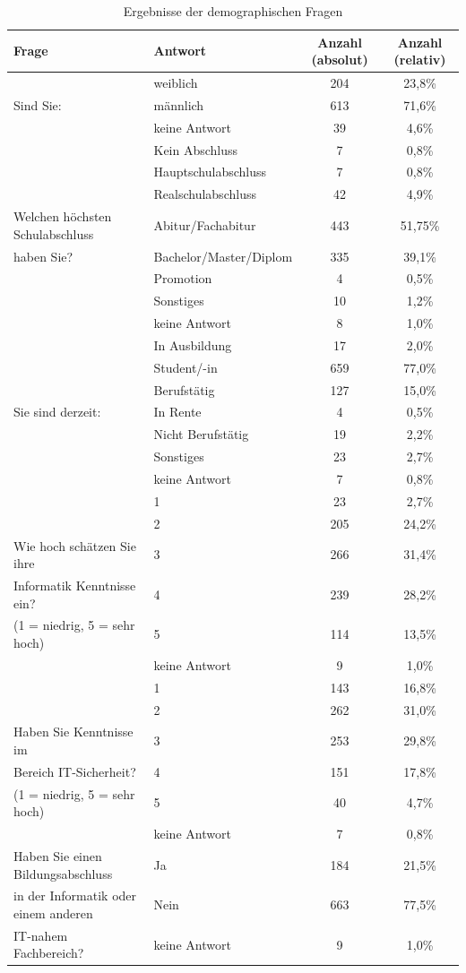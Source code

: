 \begin{table}
	\begin{tabular}[]{ l | l | c | c }
	\hline
	Frage & Antwort & Anzahl (absolut) & Anzahl (relativ) \\
	\hline
	& weiblich &  204 & 23,8\% \\
	Sind Sie:& männlich & 613 & 71,6\% \\
	& keine Antwort & 39 & 4,6\% \\
	\hline \hline
	& Kein Abschluss & 7 & 0,8\% \\
	& Hauptschulabschluss & 7 & 0,8\% \\
	& Realschulabschluss & 42 & 4,9\% \\
	Welchen höchsten Schulabschluss& Abitur/Fachabitur & 443 & 51,75\% \\
	haben Sie? & Bachelor/Master/Diplom & 335 & 39,1\% \\
	& Promotion & 4 & 0,5\% \\
	& Sonstiges & 10 & 1,2\% \\
	& keine Antwort & 8 & 1,0\% \\
	\hline \hline
	& In Ausbildung & 17 & 2,0\% \\
	& Student/-in & 659 & 77,0\% \\
	& Berufstätig & 127 & 15,0\%\\
	Sie sind derzeit: & In Rente & 4 & 0,5\% \\
	& Nicht Berufstätig & 19 & 2,2\% \\
	& Sonstiges & 23 & 2,7\% \\
	& keine Antwort & 7 & 0,8\% \\
	\hline \hline
	& 1 & 23 & 2,7\%\\
	& 2 & 205 & 24,2\% \\
	Wie hoch schätzen Sie ihre & 3 & 266 & 31,4\% \\
	Informatik Kenntnisse ein? & 4 & 239 & 28,2\% \\
	(1 = niedrig, 5 = sehr hoch)& 5 & 114 & 13,5\% \\
	& keine Antwort & 9 & 1,0\% \\
	\hline \hline
	& 1 & 143 & 16,8\% \\
	& 2 & 262 & 31,0\% \\
	Haben Sie Kenntnisse im& 3 & 253 & 29,8\% \\
	Bereich IT-Sicherheit?& 4 & 151 & 17,8\% \\
	(1 = niedrig, 5 = sehr hoch)& 5 & 40 & 4,7\% \\
	& keine Antwort & 7 & 0,8\% \\
	\hline \hline
	Haben Sie einen Bildungsabschluss & Ja & 184 & 21,5\% \\
	in der Informatik oder einem anderen & Nein & 663 & 77,5\%\\
	IT-nahem Fachbereich? & keine Antwort & 9 & 1,0\% \\
	\hline
	\end{tabular}
	\caption{Ergebnisse der demographischen Fragen}\label{demoqna}
\end{table}

